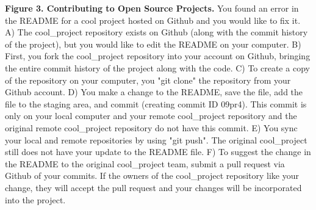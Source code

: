\textbf{Figure 3. Contributing to Open Source Projects.} You found an error in the README for a cool project hosted on Github and you would like to fix it. A) The cool\_project repository exists on Github (along with the commit history of the project), but you would like to edit the README on your computer. B) First, you fork the cool\_project repository into your account on Github, bringing the entire commit history of the project along with the code. C) To create a copy of the repository on your computer, you "git clone" the repository from your Github account. D) You make a change to the README, save the file, add the file to the staging area, and commit (creating commit ID 09pr4). This commit is only on your local computer and your remote cool\_project repository and the original remote cool\_project repository do not have this commit. E) You sync your local and remote repositories by using "git push". The original cool\_project still does not have your update to the README file. F) To suggest the change in the README to the original cool\_project team, submit a pull request via Github of your commits. If the owners of the cool\_project repository like your change, they will accept the pull request and your changes will be incorporated into the project. 
